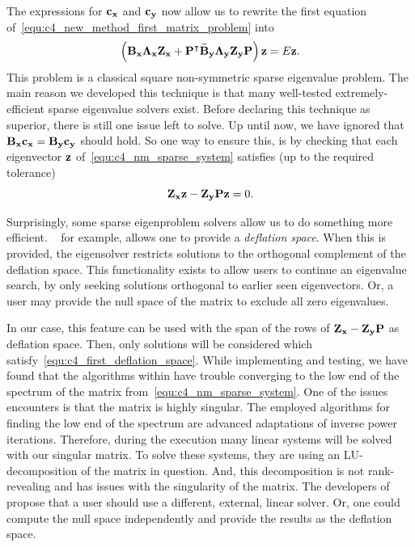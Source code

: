 The expressions for $\vb{c_x}$ and $\vb{c_y}$ now allow us to rewrite the first equation of~\eqref{equ:c4_new_method_first_matrix_problem} into
\begin{equation}\label{equ:c4_nm_sparse_system}
    \left(\vb{B_x}\vb{\Lambda_x} \vb{Z_x} + {\vb{P}}^\intercal\vb{\widetilde{B}_y}\vb{\Lambda_y}  \vb{Z_y} \vb{P}\right) \vb{z} = E \vb{z} \text{.}
\end{equation}
This problem is a classical square non-symmetric sparse eigenvalue problem. The main reason we developed this technique is that many well-tested extremely-efficient sparse eigenvalue solvers exist. Before declaring this technique as superior, there is still one issue left to solve. Up until now, we have ignored that $\vb{B_x} \vb{c_x} = \vb{B_y} \vb{c_y}$ should hold. So one way to ensure this, is by checking that each eigenvector $\vb{z}$ of~\eqref{equ:c4_nm_sparse_system} satisfies (up to the required tolerance)
\begin{equation}\label{equ:c4_first_deflation_space}
    \vb{Z_x} \vb{z} -\vb{Z_y} \vb{P} \vb{z} =0 \text{.}
\end{equation}

Surprisingly, some sparse eigenproblem solvers allow us to do something more efficient. \slepc{}~\cite{hernandez_slepc_2005} for example, allows one to provide a \emph{deflation space}. When this is provided, the eigensolver restricts solutions to the orthogonal complement of the deflation space. This functionality exists to allow users to continue an eigenvalue search, by only seeking solutions orthogonal to earlier seen eigenvectors. Or, a user may provide the null space of the matrix to exclude all zero eigenvalues.

In our case, this feature can be used with the span of the rows of $\vb{Z_x} - \vb{Z_y} \vb{P}$ as deflation space. Then, only solutions will be considered which satisfy~\eqref{equ:c4_first_deflation_space}. While implementing and testing, we have found that the algorithms within \slepc{} have trouble converging to the low end of the spectrum of the matrix from~\eqref{equ:c4_nm_sparse_system}. One of  the issues \slepc{} encounters is that the matrix is highly singular. The employed algorithms for finding the low end of the spectrum are advanced adaptations of inverse power iterations. Therefore, during the execution many linear systems will be solved with our singular matrix. To solve these systems, they are using an LU-decomposition of the matrix in question. And, this decomposition is not rank-revealing and has issues with the singularity of the matrix. The developers of \slepc{} propose that a user should use a different, external, linear solver. Or, one could compute the null space independently and provide the results as the deflation space.

